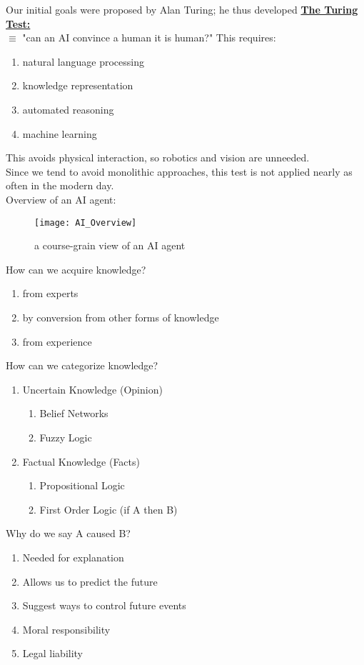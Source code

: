 \documentclass[../../lecture_notes.tex]{subfiles}
\begin{document}
\noindent Our initial goals were proposed by Alan Turing; he thus developed \textbf{\underline{The Turing Test:}}\\
\indent $\equiv$ "can an AI convince a human it is human?" This requires:
	\begin{enumerate} [itemsep=0mm]
		\item natural language processing
		\item knowledge representation
		\item automated reasoning
		\item machine learning
	\end{enumerate}
\noindent This avoids physical interaction, so robotics and vision are unneeded.\\
Since we tend to avoid monolithic approaches, this test is not applied nearly as often in the modern day.\\

\noindent Overview of an AI agent:
\begin{figure}[H]
	\centering
	\texttt{[image: AI\_Overview]}
	\caption{a course-grain view of an AI agent}
\end{figure}

\noindent How can we acquire knowledge?
	\begin{enumerate} [itemsep=0mm]
		\item from experts
		\item by conversion from other forms of knowledge
		\item from experience
	\end{enumerate}

How can we categorize knowledge?
\begin{enumerate} [itemsep=0mm]
	\item Uncertain Knowledge (Opinion)
		\begin{enumerate} [itemsep=0mm]
			\item Belief Networks
			\item Fuzzy Logic
		\end{enumerate}
	\item Factual Knowledge (Facts)
		\begin{enumerate} [itemsep=0mm]
			\item Propositional Logic
			\item First Order Logic (if A then B)
		\end{enumerate}
\end{enumerate} \medskip
        

Why do we say A caused B?
\begin{enumerate} [itemsep=0mm]
	\item Needed for explanation
	\item Allows us to predict the future
	\item Suggest ways to control future events
	\item Moral responsibility
	\item Legal liability
\end{enumerate} \medskip
\end{document}
